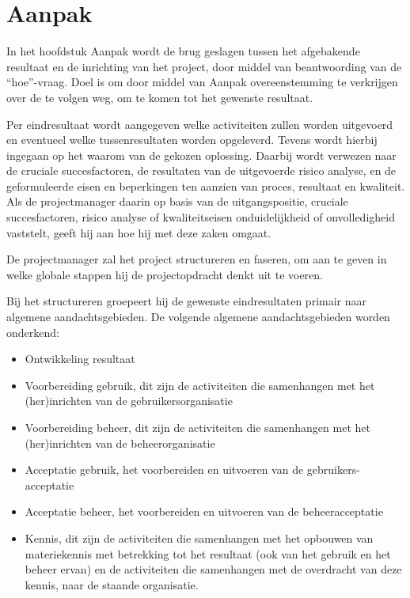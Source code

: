\section{Aanpak}
\label{aanpak}


In het hoofdstuk Aanpak wordt de brug geslagen tussen het afgebakende resultaat en de inrichting van het project,
door middel van beantwoording van de ``hoe''-vraag.
Doel is om door middel van Aanpak overeenstemming te verkrijgen over de te volgen weg, om te komen tot het gewenste resultaat.

Per eindresultaat wordt aangegeven welke activiteiten zullen worden uitgevoerd en eventueel welke tussenresultaten worden opgeleverd.
Tevens wordt hierbij ingegaan op het waarom van de gekozen oplossing.
Daarbij wordt verwezen naar de cruciale succesfactoren, de resultaten van de uitgevoerde risico analyse,
en de geformuleerde eisen en beperkingen ten aanzien van proces, resultaat en kwaliteit.
Als de projectmanager daarin op basis van de uitgangspositie, cruciale succesfactoren,
risico analyse of kwaliteitseisen onduidelijkheid of onvolledigheid vaststelt, geeft hij aan hoe hij met deze zaken omgaat.

De projectmanager zal het project structureren en faseren,
om aan te geven in welke globale stappen hij de projectopdracht denkt uit te voeren.

Bij het structureren groepeert hij de gewenste eindresultaten primair naar algemene aandachtsgebieden.
De volgende algemene aandachtsgebieden worden onderkend:

\begin{itemize}
  \item Ontwikkeling resultaat
  \item Voorbereiding gebruik, dit zijn de activiteiten die samenhangen met het (her)inrichten van de gebruikersorganisatie
  \item Voorbereiding beheer, dit zijn de activiteiten die samenhangen met het (her)inrichten van de beheerorganisatie
  \item Acceptatie gebruik, het voorbereiden en uitvoeren van de gebruikers-acceptatie
  \item Acceptatie beheer, het voorbereiden en uitvoeren van de beheeracceptatie
  \item Kennis, dit zijn de activiteiten die samenhangen met het opbouwen van materiekennis met betrekking tot het resultaat
  (ook van het gebruik en het beheer ervan) en de activiteiten die samenhangen met de overdracht van deze kennis,
  naar de staande organisatie.
\end{itemize}

